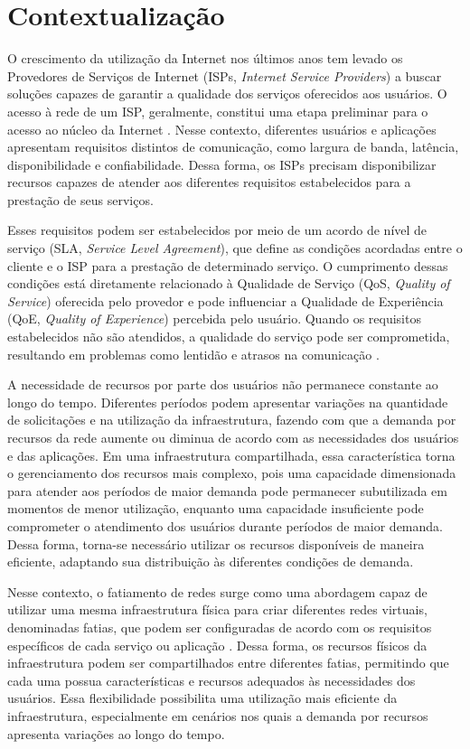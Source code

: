 \section{Contextualização}

O crescimento da utilização da Internet nos últimos anos tem levado os Provedores de Serviços de Internet (ISPs, \textit{Internet Service Providers}) a buscar soluções capazes de garantir a qualidade dos serviços oferecidos aos usuários. O acesso à rede de um ISP, geralmente, constitui uma etapa preliminar para o acesso ao núcleo da Internet \cite{kalmanek2010guide}. Nesse contexto, diferentes usuários e aplicações apresentam requisitos distintos de comunicação, como largura de banda, latência, disponibilidade e confiabilidade.  Dessa forma, os ISPs precisam disponibilizar recursos capazes de atender aos diferentes requisitos estabelecidos para a prestação de seus serviços.

Esses requisitos podem ser estabelecidos por meio de um acordo de nível de serviço (SLA, \textit{Service Level Agreement}), que define as condições acordadas entre o cliente e o ISP para a prestação de determinado serviço. O cumprimento dessas condições está diretamente relacionado à Qualidade de Serviço (QoS, \textit{Quality of Service}) oferecida pelo provedor e pode influenciar a Qualidade de Experiência (QoE, \textit{Quality of Experience}) percebida pelo usuário. Quando os requisitos estabelecidos não são atendidos, a qualidade do serviço pode ser comprometida, resultando em problemas como lentidão e atrasos na comunicação \cite{gomes2020strategies,foukas2017network}.

A necessidade de recursos por parte dos usuários não permanece constante ao longo do tempo. Diferentes períodos podem apresentar variações na quantidade de solicitações e na utilização da infraestrutura, fazendo com que a demanda por recursos da rede aumente ou diminua de acordo com as necessidades dos usuários e das aplicações. Em uma infraestrutura compartilhada, essa característica torna o gerenciamento dos recursos mais complexo, pois uma capacidade dimensionada para atender aos períodos de maior demanda pode permanecer subutilizada em momentos de menor utilização, enquanto uma capacidade insuficiente pode comprometer o atendimento dos usuários durante períodos de maior demanda. Dessa forma, torna-se necessário utilizar os recursos disponíveis de maneira eficiente, adaptando sua distribuição às diferentes condições de demanda.

Nesse contexto, o fatiamento de redes surge como uma abordagem capaz de utilizar uma mesma infraestrutura física para criar diferentes redes virtuais, denominadas fatias, que podem ser configuradas de acordo com os requisitos específicos de cada serviço ou aplicação \cite{vassilaras2017algorithmic}. Dessa forma, os recursos físicos da infraestrutura podem ser compartilhados entre diferentes fatias, permitindo que cada uma possua características e recursos adequados às necessidades dos usuários. Essa flexibilidade possibilita uma utilização mais eficiente da infraestrutura, especialmente em cenários nos quais a demanda por recursos apresenta variações ao longo do tempo.
